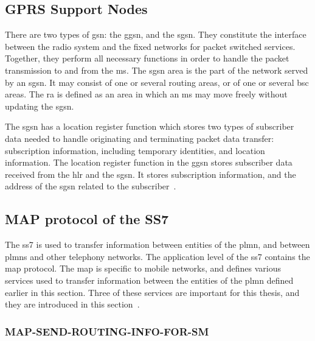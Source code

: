     \subsection{GPRS Support Nodes}

      There are two types of \gls{gsn}: the \gls{ggsn}, and the
      \gls{sgsn}. They constitute the interface between the radio
      system and the fixed networks for packet switched services.
      Together, they perform all necessary functions in order to
      handle the packet transmission to and from the \gls{ms}. The
      \gls{sgsn} area is the part of the network served by an
      \gls{sgsn}. It may consist of one or several routing areas, or
      of one or several \gls{bsc} areas. The \gls{ra} is defined as an
      area in which an \gls{ms} may move freely without updating the
      \gls{sgsn}.

      The \gls{sgsn} has a location register function which stores two
      types of subscriber data needed to handle originating and
      terminating packet data transfer: subscription information,
      including temporary identities, and location information. The
      location register function in the \gls{ggsn} stores subscriber
      data received from the \gls{hlr} and the \gls{sgsn}. It stores
      subscription information, and the address of the \gls{sgsn}
      related to the subscriber~\cite{3gpp_ts_2015}.

    \subsection{MAP protocol of the SS7} 
    \label{sec:ss7}
      
      The \gls{ss7} is used to transfer information between entities of
      the \gls{plmn}, and between \glspl{plmn} and other telephony
      networks. The application level of the \gls{ss7} contains the
      \gls{map} protocol. The \gls{map} is specific to mobile networks,
      and defines various services used to transfer information between
      the entities of the \gls{plmn} defined earlier in this section.
      Three of these services are important for this thesis, and they
      are introduced in this section~\cite{3gpp_ts_2015-2}.

      \subsubsection{MAP-SEND-ROUTING-INFO-FOR-SM}
      \label{sec:sriforsm}

